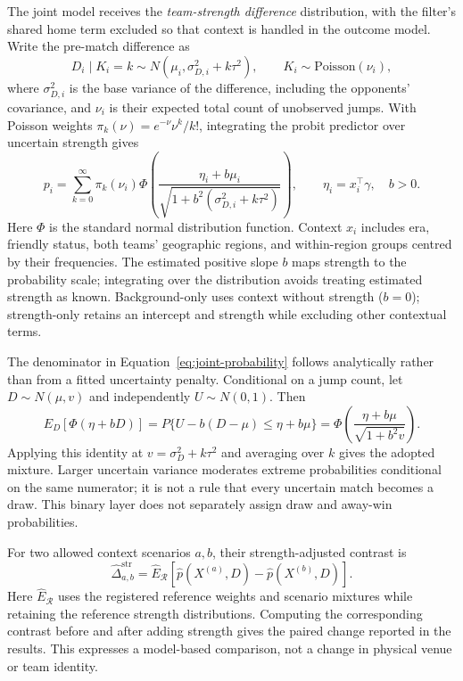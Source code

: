 The joint model receives the \emph{team-strength difference} distribution, with the filter's shared home term excluded so that context is handled in the outcome model. Write the pre-match difference as
\begin{equation}
 D_i\mid K_i=k\sim N(\mu_i,\sigma_{D,i}^2+k\tau^2),\qquad
 K_i\sim\mathrm{Poisson}(\nu_i),
 \label{eq:difference-mixture}
\end{equation}
where $\sigma_{D,i}^2$ is the base variance of the difference, including the opponents' covariance, and $\nu_i$ is their expected total count of unobserved jumps. With Poisson weights $\pi_k(\nu)=e^{-\nu}\nu^k/k!$, integrating the probit predictor over uncertain strength gives
\begin{equation}
 p_i=\sum_{k=0}^{\infty}\pi_k(\nu_i)
 \Phi\!\left(\frac{\eta_i+b\mu_i}{\sqrt{1+b^2(\sigma_{D,i}^2+k\tau^2)}}\right),
 \qquad \eta_i=x_i^\top\gamma,\quad b>0.
 \label{eq:joint-probability}
\end{equation}
Here $\Phi$ is the standard normal distribution function. Context $x_i$ includes era, friendly status, both teams' geographic regions, and within-region groups centred by their frequencies. The estimated positive slope $b$ maps strength to the probability scale; integrating over the distribution avoids treating estimated strength as known. Background-only uses context without strength ($b=0$); strength-only retains an intercept and strength while excluding other contextual terms.

The denominator in Equation~\ref{eq:joint-probability} follows analytically rather than from a fitted uncertainty penalty. Conditional on a jump count, let $D\sim N(\mu,v)$ and independently $U\sim N(0,1)$. Then
\begin{equation}
 E_D[\Phi(\eta+bD)]
 =P\{U-b(D-\mu)\leq\eta+b\mu\}
 =\Phi\!\left(\frac{\eta+b\mu}{\sqrt{1+b^2v}}\right).
 \label{eq:probit-integral}
\end{equation}
Applying this identity at $v=\sigma_D^2+k\tau^2$ and averaging over $k$ gives the adopted mixture. Larger uncertain variance moderates extreme probabilities conditional on the same numerator; it is not a rule that every uncertain match becomes a draw. This binary layer does not separately assign draw and away-win probabilities.

For two allowed context scenarios $a,b$, their strength-adjusted contrast is
\begin{equation}
 \widehat\Delta^{\mathrm{str}}_{a,b}
 =\widehat E_{\mathcal R}\!\left[\widehat p(X^{(a)},D)-\widehat p(X^{(b)},D)\right].
 \label{eq:strength-contrast}
\end{equation}
Here $\widehat E_{\mathcal R}$ uses the registered reference weights and scenario mixtures while retaining the reference strength distributions. Computing the corresponding contrast before and after adding strength gives the paired change reported in the results. This expresses a model-based comparison, not a change in physical venue or team identity.

